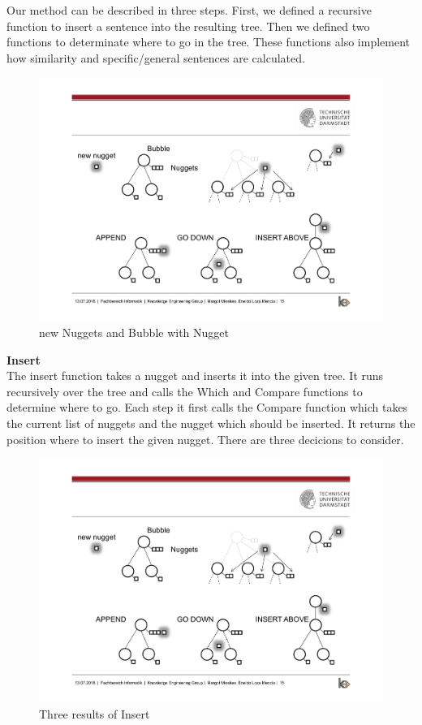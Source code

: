 
Our method can be described in three steps. First, we defined a recursive function to insert a sentence into the resulting tree. Then we defined two functions to determinate where to go in the tree. These functions also implement how similarity and specific/general sentences are calculated.

\begin{figure}[H]
	\centering
	\includegraphics[trim=3cm 10cm 15cm 5.8cm, clip=true]{img/step2_func.pdf}
	\caption{new Nuggets and Bubble with Nugget}
	\label{fig:jsd}
\end{figure}
\textbf{Insert}\\

The insert function takes a nugget and inserts it into the given tree. It runs recursively over the tree and calls the Which and Compare functions to determine where to go. Each step it first calls the Compare function which takes the current list of nuggets and the nugget which should be inserted. It returns the position where to insert the given nugget. There are three decicions to consider.
\begin{figure}[H]
	\centering
	\includegraphics[trim=3cm 3cm 3cm 11cm, clip=true, width= \textwidth]{img/step2_func.pdf}
	\caption{Three results of Insert}
	\label{fig:jsd}
\end{figure}

